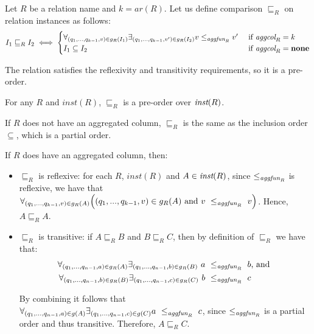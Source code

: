 \begin{defn}
Let $R$ be a relation name and $k=ar(R)$. Let us define comparison $\sqsubseteq_R$ on relation instances as follows:
$$
I_1 \sqsubseteq_R I_2 \iff
\begin{cases}
   \forall_{(q_1, ..., q_{k-1}, v) \in g_R(I_1)} \exists_{(q_1, ..., q_{k-1}, v') \in g_R(I_2)} v \le_{\textit{aggfun}_R} v' & \text{ if } \textit{aggcol}_R = k \\
   I_1 \subseteq I_2 & \text{ if } \textit{aggcol}_R = \bf{none} 
\end{cases}
$$
\end{defn}

The relation satisfies the reflexivity and transitivity requirements, so it is a pre-order.

\begin{lem}\label{lem:preorder}
For any $R$ and $inst(R)$, $\sqsubseteq_R$ is a pre-order over $\textit{inst}(R)$.
\end{lem}
\begin{prof}
If $R$ does not have an aggregated column, $\sqsubseteq_R$ is the same as the inclusion order $\subseteq$, which is a partial order.

If $R$ does have an aggregated column, then:

\begin{itemize}
\item $\sqsubseteq_R$ is reflexive: for each $R$, $inst(R)$ and $A \in \textit{inst}(R)$, since $\le_{\textit{aggfun}_R}$ is reflexive, we have that $\forall_{(q_1, ..., q_{k-1}, v) \in g_R(A)} \Big( (q_1, ..., q_{k-1}, v) \in g_R(A)~\text{and}~v~\le_{\textit{aggfun}_R}~v \Big)$. Hence, $A \sqsubseteq_R A$.
\item $\sqsubseteq_R$ is transitive: if $A \sqsubseteq_R B$ and $B \sqsubseteq_R  C$, then by definition of $\sqsubseteq_R$ we have that:
\begin{align*}
\forall_{(q_1, ..., q_{n-1}, a) \in g_R(A)} \exists_{(q_1, ..., q_{n-1}, b) \in g_R(B)}~a~\le_{\textit{aggfun}_R}~b &\text{, and } \\
\forall_{(q_1, ..., q_{n-1}, b) \in g_R(B)} \exists_{(q_1, ..., q_{n-1}, c) \in g_R(C)}~b~\le_{\textit{aggfun}_R}~c&
\end{align*}

By combining it follows that $\forall_{(q_1, ..., q_{n-1}, a) \in g(A)} \exists_{(q_1, ..., q_{n-1}, c) \in g(C)} a~\le_{\textit{aggfun}_R}~c $, since $\le_{\textit{aggfun}_R}$ is a partial order and thus transitive. Therefore, $A \sqsubseteq_R C$. \QEDA
\end{itemize}
\end{prof}

